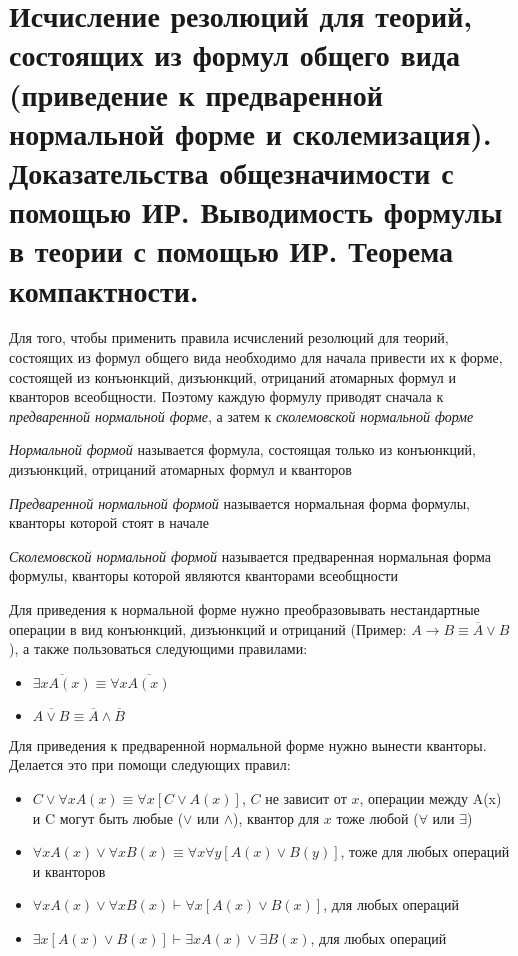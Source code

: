 \documentclass{article}
\begin{document}
\section{Исчисление резолюций для теорий, состоящих из формул общего вида (приведение к предваренной нормальной форме и сколемизация). Доказательства общезначимости с помощью ИР. Выводимость формулы в теории с помощью ИР. Теорема компактности.}
Для того, чтобы применить правила исчислений резолюций для теорий, состоящих из формул общего вида необходимо для начала привести их к форме, состоящей из конъюнкций, дизъюнкций, отрицаний атомарных формул и кванторов всеобщности. Поэтому каждую формулу приводят сначала к \textit{предваренной нормальной форме}, а затем к \textit{сколемовской нормальной форме}

\begin{definition}
	\textit{Нормальной формой} называется формула, состоящая только из конъюнкций, дизъюнкций, отрицаний атомарных формул и кванторов
\end{definition}

\begin{definition}
	\textit{Предваренной нормальной формой} называется нормальная форма формулы, кванторы которой стоят в начале
\end{definition}

\begin{definition}
	\textit{Сколемовской нормальной формой} называется предваренная нормальная форма формулы, кванторы которой являются кванторами всеобщности
\end{definition}

Для приведения к нормальной форме нужно преобразовывать нестандартные операции в вид конъюнкций, дизъюнкций и отрицаний (Пример: $A \rightarrow B \equiv \overline{A} \vee B$), а также пользоваться следующими правилами:
\begin{itemize}
	\item $\overline{\exists x A(x)} \equiv \forall x\overline{A(x)}$
	\item $\overline{A \vee B} \equiv \overline{A} \wedge \overline{B}$
\end{itemize}

Для приведения к предваренной нормальной форме нужно вынести кванторы. Делается это при помощи следующих правил:
\begin{itemize}
	\item $C \vee \forall x A(x) \equiv \forall x[C \vee A(x)]$, $C$ не зависит от $x$, операции между A(x) и C могут быть любые ($\vee$ или $\wedge$), квантор для $x$ тоже любой ($\forall$ или $\exists$)
	\item $\forall x A(x) \vee \forall x B(x) \equiv \forall x\forall y[A(x) \vee B(y)]$, тоже для любых операций и кванторов
	\item $\forall x A(x) \vee \forall x B(x) \vdash \forall x[A(x) \vee B(x)]$, для любых операций
	\item $\exists x[A(x) \vee B(x)] \vdash \exists x A(x) \vee \exists B(x)$, для любых операций
\end{itemize}
\end{document}
